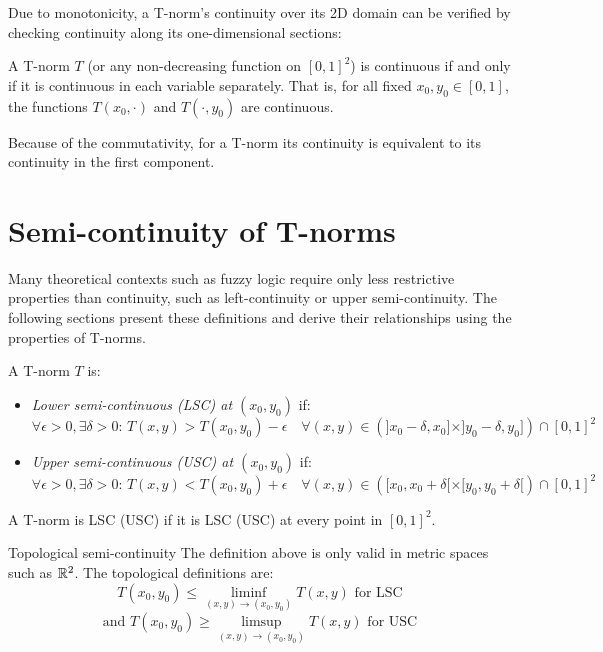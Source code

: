Due to monotonicity, a T-norm's continuity over its 2D domain can be verified by checking continuity along its one-dimensional sections:
\begin{proposition}
A T-norm $T$ (or any non-decreasing function on $[0,1]^2$) is continuous if and only if it is continuous in each variable separately. That is, for all fixed $x_0, y_0 \in [0,1]$, the functions $T(x_0, \cdot)$ and $T(\cdot, y_0)$ are continuous.
\end{proposition}

\begin{remark}
Because of the commutativity, for a T-norm
its continuity is equivalent to its continuity in the first component.\cite[p.~16]{Klement2000}
\end{remark}

\section{Semi-continuity of T-norms}
\label{app:semicont-tnorms}

Many theoretical contexts such as fuzzy logic require only less restrictive properties than continuity, such as left-continuity or upper semi-continuity. The following sections present these definitions and derive their relationships using the properties of T-norms.


\begin{definition}
    A T-norm $T$ is:
    \begin{itemize}
        \item \emph{Lower semi-continuous (LSC) at $(x_0,y_0)$} if:
        \[
        \forall \epsilon > 0, \exists \delta > 0 :\, T(x,y) > T(x_0,y_0) - \epsilon \quad \forall (x,y) \in \left(]x_0 - \delta, x_0] \times ]y_0 - \delta, y_0]\right) \cap [0,1]^2
        \]
        \item \emph{Upper semi-continuous (USC) at $(x_0,y_0)$} if:
        \[
        \forall \epsilon > 0, \exists \delta > 0 :\, T(x,y) < T(x_0,y_0) + \epsilon \quad \forall (x,y) \in \left([x_0, x_0 + \delta[ \times [y_0, y_0 + \delta[\right) \cap [0,1]^2
        \]
    \end{itemize}
    A T-norm is LSC (USC) if it is LSC (USC) at every point in $[0,1]^2$.
    \end{definition}
    \begin{notation}{Topological semi-continuity}
        The definition above is only valid in metric spaces such as $\mathbb{R}^2$. The topological definitions are: $$T(x_0, y_0) \le \liminf_{(x,y) \to (x_0,y_0)} T(x,y) \text{ for LSC}$$   $$\text{and } T(x_0, y_0) \ge \limsup_{(x,y) \to (x_0,y_0)} T(x,y)\text{ for USC}$$
    \end{notation}
  
